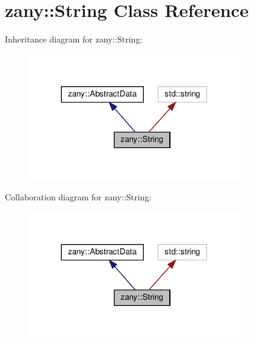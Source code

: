 \hypertarget{classzany_1_1_string}{}\section{zany\+:\+:String Class Reference}
\label{classzany_1_1_string}


Inheritance diagram for zany\+:\+:String\+:
\nopagebreak
\begin{figure}[H]
\begin{center}
\leavevmode
\includegraphics[width=260pt]{classzany_1_1_string__inherit__graph}
\end{center}
\end{figure}


Collaboration diagram for zany\+:\+:String\+:
\nopagebreak
\begin{figure}[H]
\begin{center}
\leavevmode
\includegraphics[width=260pt]{classzany_1_1_string__coll__graph}
\end{center}
\end{figure}
